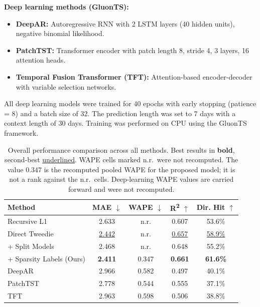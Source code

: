 \documentclass[review,authoryear]{elsarticle}
\begin{document}
\textbf{Deep learning methods (GluonTS):}
\begin{itemize}
    \item \textbf{DeepAR:} Autoregressive RNN with 2 LSTM layers (40 hidden units), negative binomial likelihood.
    \item \textbf{PatchTST:} Transformer encoder with patch length 8, stride 4, 3 layers, 16 attention heads.
    \item \textbf{Temporal Fusion Transformer (TFT):} Attention-based encoder-decoder with variable selection networks.
\end{itemize}

All deep learning models were trained for 40 epochs with early stopping (patience = 8) and a batch size of 32. The prediction length was set to 7 days with a context length of 30 days. Training was performed on CPU using the GluonTS framework.

\begin{table}[H]
    \centering
    \caption{Overall performance comparison across all methods. Best results in \textbf{bold}, second-best \underline{underlined}. WAPE cells marked n.r.\ were not recomputed. The value 0.347 is the recomputed pooled WAPE for the proposed model; it is not a rank against the n.r.\ cells. Deep-learning WAPE values are carried forward and were not recomputed.}
    \label{tab:overall}
    \begin{tabular}{lcccc}
        \toprule
        \textbf{Method} & \textbf{MAE $\downarrow$} & \textbf{WAPE $\downarrow$} & \textbf{R\textsuperscript{2} $\uparrow$} & \textbf{Dir. Hit $\uparrow$} \\
        \midrule
        Recursive L1       & 2.633 & n.r. & 0.607 & 53.6\% \\
        Direct Tweedie     & \underline{2.442} & n.r. & \underline{0.657} & \underline{58.9\%} \\
        + Split Models     & 2.468 & n.r. & 0.648 & 55.2\% \\
        + Sparsity Labels (Ours) & \textbf{2.411} & 0.347 & \textbf{0.661} & \textbf{61.6\%} \\
        \midrule
        DeepAR             & 2.966 & 0.582 & 0.497 & 40.1\% \\
        PatchTST           & 2.778 & 0.544 & 0.555 & 37.1\% \\
        TFT                & 2.963 & 0.598 & 0.506 & 38.8\% \\
        \bottomrule
    \end{tabular}
\end{table}
\end{document}
